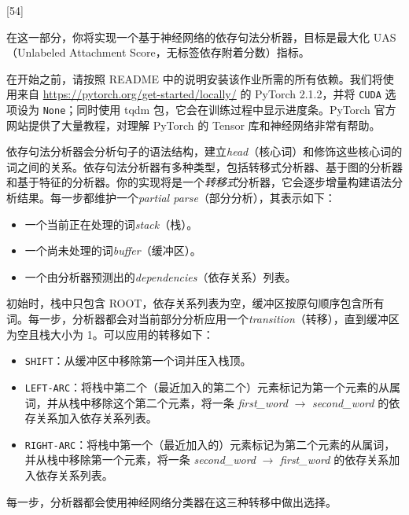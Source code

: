 [54]

在这一部分，你将实现一个基于神经网络的依存句法分析器，目标是最大化 UAS（Unlabeled Attachment Score，无标签依存附着分数）指标。\newline

在开始之前，请按照 README 中的说明安装该作业所需的所有依赖。我们将使用来自 \url{https://pytorch.org/get-started/locally/} 的 PyTorch 2.1.2，并将 \texttt{CUDA} 选项设为 \texttt{None}；同时使用 tqdm 包，它会在训练过程中显示进度条。PyTorch 官方网站提供了大量教程，对理解 PyTorch 的 Tensor 库和神经网络非常有帮助。\newline

依存句法分析器会分析句子的语法结构，建立\textit{head}（核心词）和修饰这些核心词的词之间的关系。依存句法分析器有多种类型，包括转移式分析器、基于图的分析器和基于特征的分析器。你的实现将是一个{\it 转移式}分析器，它会逐步增量构建语法分析结果。每一步都维护一个\textit{partial parse}（部分分析），其表示如下：
\begin{itemize}
\item 一个当前正在处理的词{\it stack}（栈）。
\item 一个尚未处理的词{\it buffer}（缓冲区）。
\item 一个由分析器预测出的{\it dependencies}（依存关系）列表。
\end{itemize}
初始时，栈中只包含 ROOT，依存关系列表为空，缓冲区按原句顺序包含所有词。每一步，分析器都会对当前部分分析应用一个{\it transition}（转移），直到缓冲区为空且栈大小为 1。可以应用的转移如下：
\begin{itemize}
\item \texttt{SHIFT}：从缓冲区中移除第一个词并压入栈顶。
\item \texttt{LEFT-ARC}：将栈中第二个（最近加入的第二个）元素标记为第一个元素的从属词，并从栈中移除这个第二个元素，将一条 \textit{first\_word} $\rightarrow$ \textit{second\_word} 的依存关系加入依存关系列表。
\item \texttt{RIGHT-ARC}：将栈中第一个（最近加入的）元素标记为第二个元素的从属词，并从栈中移除第一个元素，将一条 \textit{second\_word} $\rightarrow$ \textit{first\_word} 的依存关系加入依存关系列表。
\end{itemize}
每一步，分析器都会使用神经网络分类器在这三种转移中做出选择。

